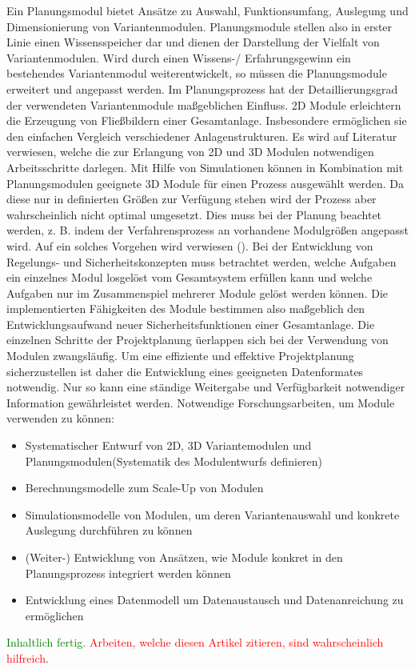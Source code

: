 Ein Planungsmodul bietet Ans\"atze zu Auswahl, Funktionsumfang, Auslegung und Dimensionierung von Variantenmodulen. Planungsmodule stellen also in erster Linie einen Wissensspeicher dar und dienen der Darstellung der Vielfalt von Variantenmodulen. Wird durch einen Wissens-/ Erfahrungsgewinn ein bestehendes Variantenmodul weiterentwickelt, so m\"ussen die Planungsmodule erweitert und angepasst werden.
Im Planungsprozess hat der Detaillierungsgrad der verwendeten Variantenmodule ma\ss{}geblichen Einfluss. 2D Module erleichtern die Erzeugung von Flie\ss{}bildern einer Gesamtanlage. Insbesondere erm\"oglichen sie den einfachen Vergleich verschiedener Anlagenstrukturen. Es wird auf Literatur verwiesen, welche die zur Erlangung von 2D und 3D Modulen notwendigen Arbeitsschritte darlegen. Mit Hilfe von Simulationen k\"onnen in Kombination mit Planungsmodulen geeignete 3D Module f\"ur einen Prozess ausgew\"ahlt werden. Da diese nur in definierten Gr\"o\ss{}en zur Verf\"ugung stehen wird der Prozess aber wahrscheinlich nicht optimal umgesetzt. Dies muss bei der Planung beachtet werden, z. B. indem der Verfahrensprozess an vorhandene Modulgr\"o\ss{}en angepasst wird. Auf ein solches Vorgehen wird verwiesen (\cite{Seifert_2012}). Bei der Entwicklung von Regelungs- und Sicherheitskonzepten muss betrachtet werden, welche Aufgaben ein einzelnes Modul losgel\"ost vom Gesamtsystem erf\"ullen kann und welche Aufgaben nur im Zusammenspiel mehrerer Module gel\"ost werden k\"onnen. Die implementierten F\"ahigkeiten des Module bestimmen also ma\ss{}geblich den Entwicklungsaufwand neuer Sicherheitsfunktionen einer Gesamtanlage. 
Die einzelnen Schritte der Projektplanung \"uerlappen sich bei der Verwendung von Modulen zwangsl\"aufig. Um eine effiziente und effektive Projektplanung sicherzustellen ist daher die Entwicklung eines geeigneten Datenformates notwendig. Nur so kann eine st\"andige Weitergabe und Verf\"ugbarkeit notwendiger Information gew\"ahrleistet werden.  
Notwendige Forschungsarbeiten, um Module verwenden zu k\"onnen: \begin{itemize}
\item Systematischer Entwurf von 2D, 3D Variantemodulen und Planungsmodulen(Systematik des Modulentwurfs definieren)
\item Berechnungsmodelle zum Scale-Up von Modulen
\item Simulationsmodelle von Modulen, um deren Variantenauswahl und konkrete Auslegung durchf\"uhren zu k\"onnen
\item (Weiter-) Entwicklung von Ans\"atzen, wie Module konkret in den Planungsprozess integriert werden k\"onnen
\item Entwicklung eines Datenmodell um Datenaustausch und Datenanreichung zu erm\"oglichen
\end{itemize}
\hfill \newline
\textcolor{green}{Inhaltlich fertig.} \textcolor{red}{Arbeiten, welche diesen Artikel zitieren, sind wahrscheinlich hilfreich}.

